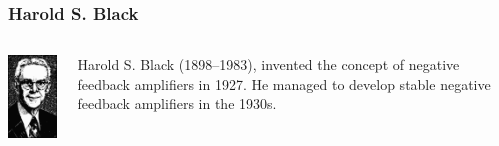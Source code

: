 \documentclass{beamer}
\begin{document}
\begin{frame}
\frametitle{Harold S. Black}
\label{sec-2-9}
\begin{columns}
\begin{column}{0.3\textwidth}
\label{sec-2-9-1}

    \includegraphics[width=.9\linewidth]{image/Black.png}
\end{column}
\begin{column}{0.7\textwidth}
\label{sec-2-9-2}


   Harold S. Black (1898–1983), invented the concept of negative feedback amplifiers in 1927. He managed to develop stable negative feedback amplifiers in the 1930s.
\end{column}
\end{columns}
\end{frame}
\end{document}
